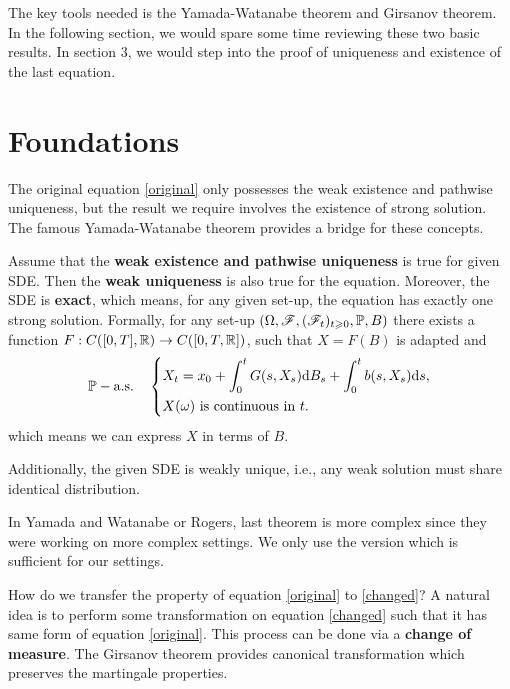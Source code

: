 \documentclass[8pt,onesided]{article}
\begin{document}
The key tools needed is the Yamada-Watanabe theorem and Girsanov theorem. In the following section, we would spare some time reviewing these two basic results. In section 3, we would step into the proof of uniqueness and existence of the last equation.

\section{Foundations}

The original equation \ref{original} only possesses the weak existence and pathwise uniqueness, but the result we require involves the existence of strong solution. The famous Yamada-Watanabe theorem provides a bridge for these concepts.

\begin{theorem}
     \label{ym}  Assume that the \textbf{weak existence and pathwise uniqueness} is true for given SDE. Then the \textbf{weak uniqueness} is also true for the equation. Moreover, the SDE is \textbf{exact}, which means, for any given set-up, the equation has exactly one strong solution. Formally, for any set-up $(\Omega, \mathscr{F},(\mathscr{F}_t)_{t\geqslant 0}, \mathbb{P}, B)$ there exists a function $F:C([0,T],\mathbb{R})\to C([0,T,\mathbb{R}])$, such that $X=F(B)$ is adapted and
    \begin{equation*}
        \mathbb{P}-\text{a.s.} \quad\left\{
        \begin{aligned}
        & X_t=x_0+\int_0^t G(s,X_s)\dd B_s +\int_0^t b(s,X_s) \dd s,\\
            &X(\omega) \text{ is continuous in } t.
        \end{aligned}
        \right.
    \end{equation*}
    which means we can express $X$ in terms of $B$.

Additionally, the given SDE is weakly unique, i.e., any weak solution must share identical distribution. 
\end{theorem}

\begin{remark}
    In Yamada and Watanabe\cite{yamada1971} or Rogers\cite{rogers2000diffusions2}, last theorem is more complex since they were working on more complex settings. We only use the version which is sufficient for our settings. 
\end{remark}

How do we transfer the property of equation \ref{original} to \ref{changed}? A natural idea is to perform some transformation on equation \ref{changed} such that it has same form of equation \ref{original}. This process can be done via a \textbf{change of measure}. The Girsanov theorem provides canonical transformation which preserves the martingale properties. 
\end{document}
